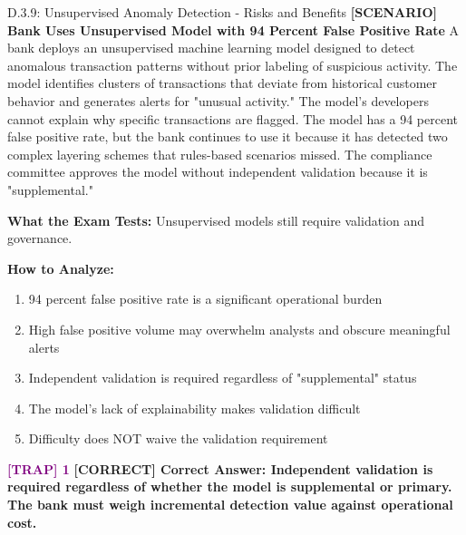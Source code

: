 \documentclass[11pt,a4paper]{beamer}
\newcommand{\trap}[1]{\textcolor{purple}{\textbf{[TRAP] 1}}}
\newcommand{\correct}[1]{\textcolor{green!50!black}{\textbf{[CORRECT] #1}}}
\newcommand{\scenario}[1]{\textcolor{blue!70!black}{\textbf{[SCENARIO] #1}}}
\begin{document}
\begin{frame}{D.3.9: Unsupervised Anomaly Detection - Risks and Benefits}
	\scenario{Bank Uses Unsupervised Model with 94 Percent False Positive Rate}
	A bank deploys an unsupervised machine learning model designed to detect anomalous transaction patterns without prior labeling of suspicious activity. The model identifies clusters of transactions that deviate from historical customer behavior and generates alerts for "unusual activity." The model's developers cannot explain why specific transactions are flagged. The model has a 94 percent false positive rate, but the bank continues to use it because it has detected two complex layering schemes that rules-based scenarios missed. The compliance committee approves the model without independent validation because it is "supplemental."
	
	\vspace{0.1cm}
	\textbf{What the Exam Tests:} Unsupervised models still require validation and governance.
	
	\vspace{0.1cm}
	\textbf{How to Analyze:}
	\begin{enumerate}
		\item 94 percent false positive rate is a significant operational burden
		\item High false positive volume may overwhelm analysts and obscure meaningful alerts
		\item Independent validation is required regardless of "supplemental" status
		\item The model's lack of explainability makes validation difficult
		\item Difficulty does NOT waive the validation requirement
	\end{enumerate}
	
	\trap{Common Distractor: "Unsupervised models are exempt from standard validation requirements."}
	\correct{Correct Answer: Independent validation is required regardless of whether the model is supplemental or primary. The bank must weigh incremental detection value against operational cost.}
\end{frame}

\end{document}

